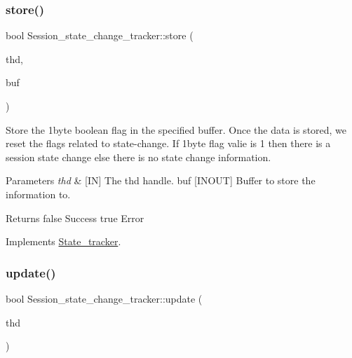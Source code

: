 \subsubsection{\texorpdfstring{store()}{store()}}
{\footnotesize\ttfamily bool Session\+\_\+state\+\_\+change\+\_\+tracker\+::store (\begin{DoxyParamCaption}\item[{T\+HD $\ast$}]{thd,  }\item[{String \&}]{buf }\end{DoxyParamCaption})\hspace{0.3cm}{\ttfamily [virtual]}}



Store the 1byte boolean flag in the specified buffer. Once the data is stored, we reset the flags related to state-\/change. If 1byte flag valie is 1 then there is a session state change else there is no state change information. 


\begin{DoxyParams}{Parameters}
{\em thd} & \mbox{[}IN\mbox{]} The thd handle.  buf \mbox{[}I\+N\+O\+UT\mbox{]} Buffer to store the information to.\\
\hline
\end{DoxyParams}
\begin{DoxyReturn}{Returns}
false Success true Error 
\end{DoxyReturn}


Implements \mbox{\hyperlink{classState__tracker_aee5cd5c5ed19fbd4c8ac01dbd62471e7}{State\+\_\+tracker}}.

\mbox{\label{classSession__state__change__tracker_abab633a67ce00f87c65059317242eb6c}} 
\subsubsection{\texorpdfstring{update()}{update()}}
{\footnotesize\ttfamily bool Session\+\_\+state\+\_\+change\+\_\+tracker\+::update (\begin{DoxyParamCaption}\item[{T\+HD $\ast$}]{thd }\end{DoxyParamCaption})\hspace{0.3cm}{\ttfamily [virtual]}}

